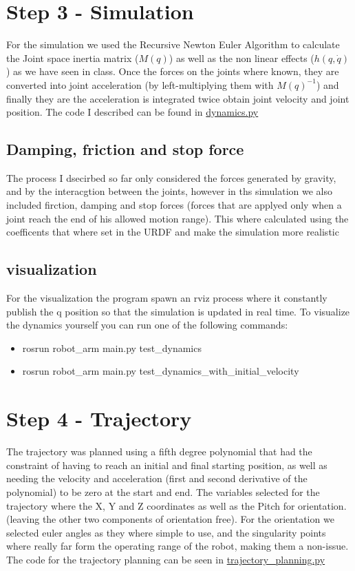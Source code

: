 \documentclass[12pt,a4paper]{article}
\begin{document}
\section{Step 3 - Simulation}

For the simulation we used the Recursive Newton Euler Algorithm to calculate
the Joint space inertia matrix ($M(q)$) as well as the non linear effects ($h(q,\dot{q})$)
as we have seen in class. Once the forces on the joints where known, they are converted
into joint acceleration (by left-multiplying them with $M(q)^{-1}$) and 
finally they are the acceleration is integrated twice obtain joint velocity and joint position.
The code I described can be found in
\href{https://github.com/lucaSartore/RobotArm/blob/master/src/robot_arm/src/data_processing/dynamics.py}{dynamics.py}

\subsection{Damping, friction and stop force}
The process I dsecirbed so far only considered the forces generated
by gravity, and by the interacgtion between the joints, however in ths simulation
we also included firction, damping and stop forces (forces that are applyed only when a joint
reach the end of his allowed motion range). This where calculated
using the coefficents that where set in the URDF and make the simulation more realistic


\subsection{visualization}

For the visualization the program spawn an rviz process where it constantly 
publish the q position so that the simulation is updated in real time.
To visualize the dynamics yourself you can run one of the following commands:
\begin{itemize}
    \item rosrun robot\_arm main.py test\_dynamics
    \item rosrun robot\_arm main.py test\_dynamics\_with\_initial\_velocity
\end{itemize}


\section{Step 4 - Trajectory}
The trajectory was planned using a fifth degree polynomial that had the constraint of having
to reach an initial and final starting position, as well as needing the
velocity and acceleration (first and second derivative of the polynomial)
to be zero at the start and end.
The variables selected for the trajectory where the X, Y and Z coordinates
as well as the Pitch for orientation. (leaving the other two components of orientation
free).
For the orientation we selected euler angles as they where simple to use, and the singularity
points where really far form the operating range of the robot, making them a non-issue.
The code for the trajectory planning can be seen in
\href{https://github.com/lucaSartore/RobotArm/blob/master/src/robot_arm/src/data_processing/trajectory_planning.py}{trajectory\_planning.py}
\end{document}
